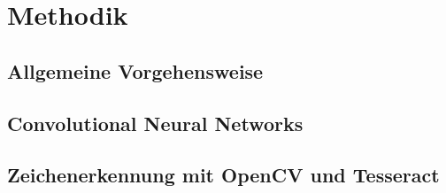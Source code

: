 \section{Methodik}

\subsection{Allgemeine Vorgehensweise}

\subsection{Convolutional Neural Networks}

\subsection{Zeichenerkennung mit OpenCV und Tesseract}